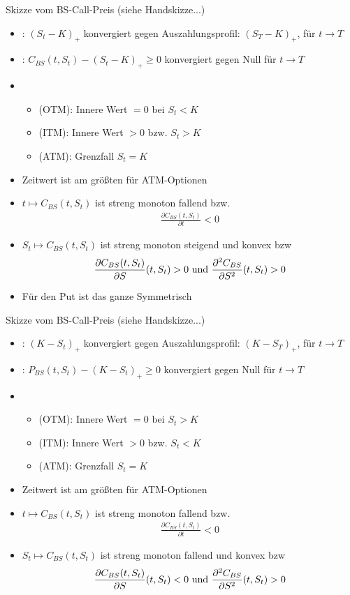 Skizze vom BS-Call-Preis (siehe Handskizze...)
\begin{itemize}
	\item {}: $(S_t -K)_+$ konvergiert gegen Auszahlungsprofil: $(S_T - K)_+$, für $t \to T$
	\item {}: $C_{BS}(t,S_t) - (S_t - K)_+ \ge 0$ konvergiert gegen Null für $t \to T$
	\item 
	\begin{itemize}
		\item {} (OTM): Innere Wert $=0$ bei $S_t < K$
		\item {} (ITM): Innere Wert $>0$ bzw. $S_t > K$
		\item {} (ATM): Grenzfall $S_t = K$
	\end{itemize}
	\item Zeitwert ist am größten für ATM-Optionen
	\item $t \mapsto C_{BS}(t,S_t)$ ist streng monoton fallend bzw.
	\begin{align*}
	\frac{\partial C_{BS}(t,S_t)}{\partial t} < 0
	\end{align*}
	\item $S_t \mapsto C_{BS}(t,S_t)$ ist streng monoton steigend und konvex bzw
	\begin{align*}
	\frac{\partial C_{BS}(t,S_t)}{\partial S}(t,S_t) > 0 \text{ und } \frac{\partial^2 C_{BS}}{\partial S^2}(t,S_t) > 0
	\end{align*}
	\item Für den Put ist das ganze Symmetrisch
\end{itemize}
Skizze vom BS-Call-Preis (siehe Handskizze...)
\begin{itemize}
	\item {}: $(K -S_t)_+$ konvergiert gegen Auszahlungsprofil: $(K - S_T)_+$, für $t \to T$
	\item {}: $P_{BS}(t,S_t) - (K - S_t)_+ \ge 0$ konvergiert gegen Null für $t \to T$
	\item 
	\begin{itemize}
		\item {} (OTM): Innere Wert $=0$ bei $S_t > K$
		\item {} (ITM): Innere Wert $>0$ bzw. $S_t < K$
		\item {} (ATM): Grenzfall $S_t = K$
	\end{itemize}
	\item Zeitwert ist am größten für ATM-Optionen
	\item $t \mapsto C_{BS}(t,S_t)$ ist streng monoton fallend bzw.
	\begin{align*}
	\frac{\partial C_{BS}(t,S_t)}{\partial t} < 0
	\end{align*}
	\item $S_t \mapsto C_{BS}(t,S_t)$ ist streng monoton fallend und konvex bzw
	\begin{align*}
	\frac{\partial C_{BS}(t,S_t)}{\partial S}(t,S_t) < 0 \text{ und } \frac{\partial^2 C_{BS}}{\partial S^2}(t,S_t) > 0
	\end{align*}
\end{itemize}
